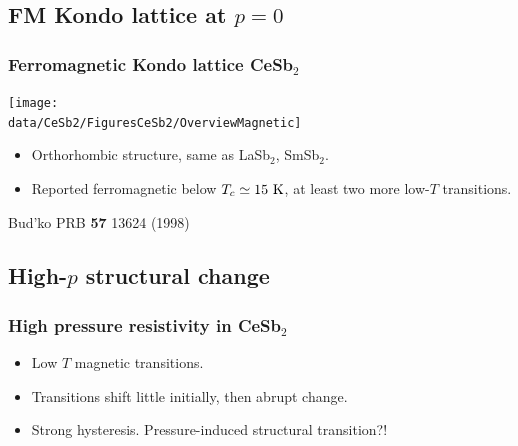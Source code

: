 \subsection{FM Kondo lattice at $p=0$}
\begin{frame}[label=CeSb2Intro]
\frametitle{Ferromagnetic Kondo lattice CeSb$_2$}
\centerline{\texttt{[image: \\data/CeSb2/FiguresCeSb2/OverviewMagnetic]}}

\vspace{1.5em}
\begin{itemize}
\item Orthorhombic structure, same as LaSb$_2$, SmSb$_2$.

\item Reported ferromagnetic below $T_c \simeq 15~\rm K$, at least two more low-$T$ transitions.
%
\end{itemize}

\vspace{3 em}
\centerline{\makebox[\linewidth]{\rule{0.85\textwidth}{0.4pt}}}

\centerline{\scriptsize Bud'ko PRB {\bf 57} 13624 (1998)}
\end{frame}


\subsection{High-$p$ structural change}
\begin{frame}[label=CeSb2Res]
\frametitle{High pressure resistivity in CeSb$_2$}
\vspace{0em}
\centerline{}

\vspace{0em}
\begin{itemize}
\item <visible@1-> Low $T$ magnetic transitions.

\item <visible@2-> Transitions shift little initially, then abrupt change.


\item <visible@3-> Strong hysteresis. Pressure-induced structural transition?!
\end{itemize}

\end{frame}




